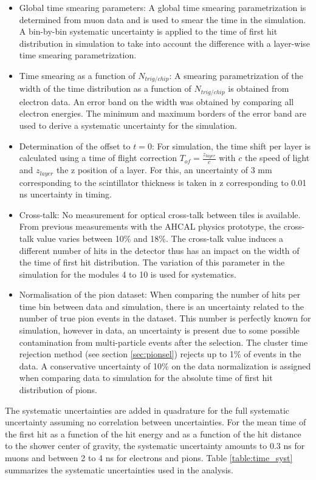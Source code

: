 \documentclass{JINST}
\begin{document}
\begin{itemize}
  \item Global time smearing parameters: A global time smearing parametrization is determined from muon data and is used to smear the time in the simulation. A bin-by-bin systematic uncertainty is applied to the time of first hit distribution in simulation to take into account the difference with a layer-wise time smearing parametrization.
  \item Time smearing as a function of $N_{trig/chip}$: A smearing parametrization of the width of the time distribution as a function of $N_{trig/chip}$ is obtained from electron data. An error band on the width was obtained by comparing all electron energies. The minimum and maximum borders of the error band are used to derive a systematic uncertainty for the simulation.
  \item Determination of the offset to $t=0$: For simulation, the time shift per layer is calculated using a time of flight correction $T_{of} = \frac{z_{layer}}{c}$ with $c$ the speed of light and $z_{layer}$ the z position of a layer. For this, an uncertainty of 3 mm corresponding to the scintillator thickness is taken in z corresponding to 0.01 ns uncertainty in timing.
  \item Cross-talk: No measurement for optical cross-talk between tiles is available. From previous measurements with the AHCAL physics prototype, the cross-talk value varies between 10\% and 18\%. The cross-talk value induces a different number of hits in the detector thus has an impact on the width of the time of first hit distribution. The variation of this parameter in the simulation for the modules 4 to 10 is used for systematics.
  \item Normalisation of the pion dataset: When comparing the number of hits per time bin between data and simulation, there is an uncertainty related to the number of true pion events in the dataset. This number is perfectly known for simulation, however in data, an uncertainty is present due to some possible contamination from multi-particle events after the selection. The cluster time rejection method (see section \ref{sec:pionsel}) rejects up to 1\% of events in the data. A conservative uncertainty of 10\% on the data normalization is assigned when comparing data to simulation for the absolute time of first hit distribution of pions.
\end{itemize}

The systematic uncertainties are added in quadrature for the full systematic uncertainty assuming no correlation between uncertainties. For the mean time of the first hit as a function of the hit energy and as a function of the hit distance to the shower center of gravity, the systematic uncertainty amounts to 0.3 ns for muons and between 2 to 4 ns for electrons and pions. Table \ref{table:time_syst} summarizes the systematic uncertainties used in the analysis.
\end{document}

